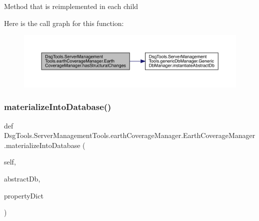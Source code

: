 \begin{DoxyVerb}Method that is reimplemented in each child
\end{DoxyVerb}
 Here is the call graph for this function\+:
\nopagebreak
\begin{figure}[H]
\begin{center}
\leavevmode
\includegraphics[width=350pt]{class_dsg_tools_1_1_server_management_tools_1_1earth_coverage_manager_1_1_earth_coverage_manager_adecdddf9813576c871f87ab5cee417b2_cgraph}
\end{center}
\end{figure}
\mbox{\label{class_dsg_tools_1_1_server_management_tools_1_1earth_coverage_manager_1_1_earth_coverage_manager_ad06d5264ccd27c99fe7b995d6d6fa2d3}} 
\subsubsection{\texorpdfstring{materialize\+Into\+Database()}{materializeIntoDatabase()}}
{\footnotesize\ttfamily def Dsg\+Tools.\+Server\+Management\+Tools.\+earth\+Coverage\+Manager.\+Earth\+Coverage\+Manager.\+materialize\+Into\+Database (\begin{DoxyParamCaption}\item[{}]{self,  }\item[{}]{abstract\+Db,  }\item[{}]{property\+Dict }\end{DoxyParamCaption})}

